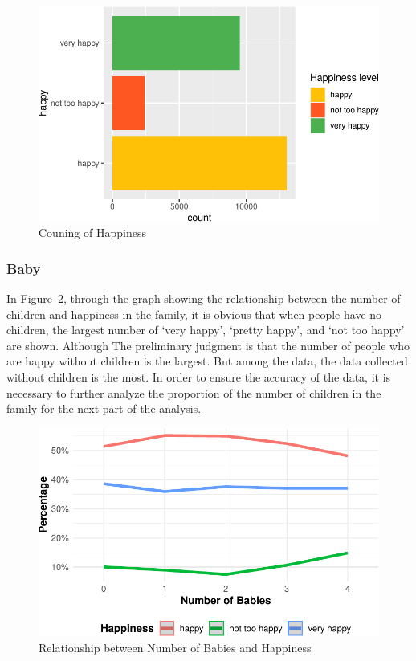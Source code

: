 \documentclass[
  letterpaper,
  DIV=11,
  numbers=noendperiod]{scrartcl}
\begin{document}
\begin{figure}

{\centering \includegraphics{paper_files/figure-pdf/fig-one-1.pdf}

}

\caption{\label{fig-one}Couning of Happiness}

\end{figure}

\hypertarget{baby}{%
\subsubsection{Baby}\label{baby}}

In Figure~\ref{fig-two}, through the graph showing the relationship
between the number of children and happiness in the family, it is
obvious that when people have no children, the largest number of `very
happy', `pretty happy', and `not too happy' are shown. Although The
preliminary judgment is that the number of people who are happy without
children is the largest. But among the data, the data collected without
children is the most. In order to ensure the accuracy of the data, it is
necessary to further analyze the proportion of the number of children in
the family for the next part of the analysis.

\begin{figure}

{\centering \includegraphics{paper_files/figure-pdf/fig-two-1.pdf}

}

\caption{\label{fig-two}Relationship between Number of Babies and
Happiness}

\end{figure}
\end{document}
